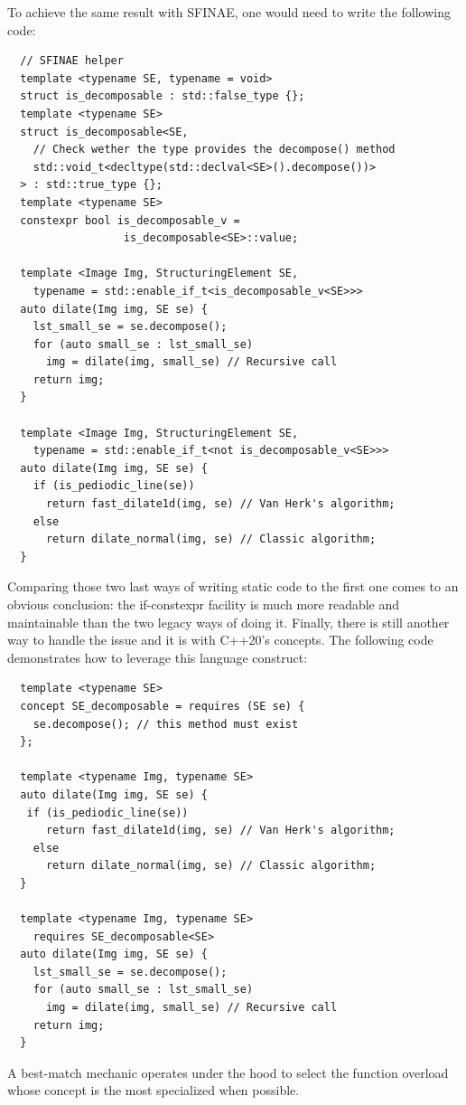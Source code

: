 To achieve the same result with SFINAE, one would need to write the following code:

\begin{verbatim}
  // SFINAE helper
  template <typename SE, typename = void>
  struct is_decomposable : std::false_type {};
  template <typename SE>
  struct is_decomposable<SE,
    // Check wether the type provides the decompose() method
    std::void_t<decltype(std::declval<SE>().decompose())>
  > : std::true_type {};
  template <typename SE>
  constexpr bool is_decomposable_v =
                  is_decomposable<SE>::value;

  template <Image Img, StructuringElement SE,
    typename = std::enable_if_t<is_decomposable_v<SE>>>
  auto dilate(Img img, SE se) {
    lst_small_se = se.decompose();
    for (auto small_se : lst_small_se)
      img = dilate(img, small_se) // Recursive call
    return img;
  }

  template <Image Img, StructuringElement SE,
    typename = std::enable_if_t<not is_decomposable_v<SE>>>
  auto dilate(Img img, SE se) {
    if (is_pediodic_line(se))
      return fast_dilate1d(img, se) // Van Herk's algorithm;
    else
      return dilate_normal(img, se) // Classic algorithm;
  }
\end{verbatim}

Comparing those two last ways of writing static code to the first one comes to an obvious conclusion: the if-constexpr
facility is much more readable and maintainable than the two legacy ways of doing it. Finally, there is still another
way to handle the issue and it is with C++20's concepts. The following code demonstrates how to leverage this language
construct:

\begin{verbatim}
  template <typename SE>
  concept SE_decomposable = requires (SE se) {
    se.decompose(); // this method must exist
  };

  template <typename Img, typename SE>
  auto dilate(Img img, SE se) {
   if (is_pediodic_line(se))
      return fast_dilate1d(img, se) // Van Herk's algorithm;
    else
      return dilate_normal(img, se) // Classic algorithm;
  }

  template <typename Img, typename SE>
    requires SE_decomposable<SE>
  auto dilate(Img img, SE se) {
    lst_small_se = se.decompose();
    for (auto small_se : lst_small_se)
      img = dilate(img, small_se) // Recursive call
    return img;
  }
\end{verbatim}
A best-match mechanic operates under the hood to select the function overload whose concept is the most specialized when
possible.


